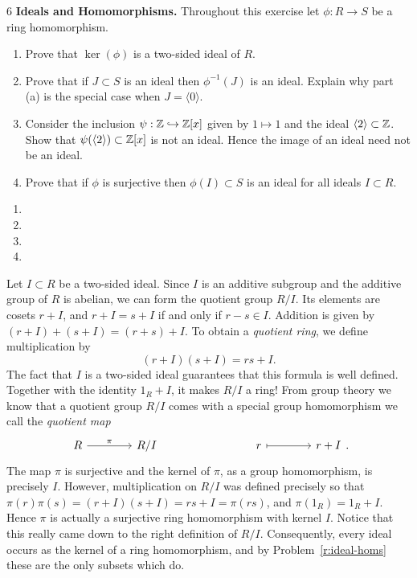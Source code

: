 \documentclass[Notebook.tex]{subfiles}
\begin{document}
\newpage

\begin{problem}{6}\label{r:ideal-homs}
	\textbf{Ideals and Homomorphisms.} Throughout this exercise let $\phi:R\to S$ be a ring homomorphism.
	\begin{enumerate}[label=(\alph*),ref=\theenumi\alph*]
		\item Prove that $\ker(\phi)$ is a two-sided ideal of $R$.
		\item Prove that if $J\subset S$ is an ideal then $\phi^{-1}(J)$ is an ideal. Explain why part (a) is the special case when $J=\langle0\rangle$.
		\item Consider the inclusion $\psi:\mathbb Z \hookrightarrow\mathbb Z[x]$ given by $1\mapsto 1$ and the ideal $\langle 2 \rangle \subset \mathbb Z$. Show that $\psi(\langle 2 \rangle) \subset \mathbb Z[x]$ is not an ideal. Hence the image of an ideal need not be an ideal.
		\item Prove that if $\phi$ is surjective then $\phi(I) \subset S$ is an ideal for all ideals $I \subset R$.
	\end{enumerate}
\end{problem}

\begin{solution}
	\bbni
	\begin{enumerate}[label=(\alph*),ref=\theenumi\alph*]
		\item
		\item
		\item
		\item
	\end{enumerate}
\end{solution}

\newpage

Let $I\subset R$ be a two-sided ideal. Since $I$ is an additive subgroup and the additive group of $R$ is abelian, we can form the quotient group $R/I$. Its elements are cosets $r+I$, and $r+I=s+I$ if and only if $r-s\in I$. Addition is given by $(r+I)+(s+I)=(r+s)+I$. To obtain a \emph{quotient ring}, we define multiplication by
\[
(r+I)(s+I)=rs+I.
\]
The fact that $I$ is a two-sided ideal guarantees that this formula is well defined. Together with the identity $1_R+I$, it makes $R/I$ a ring! From group theory we know that a quotient group $R/I$ comes with a special group homomorphism we call the \emph{quotient map}
\[
\begin{tikzcd}[row sep = .3em, column sep = 4em]
	R \arrow[r, "\pi"] & R/I & & r \arrow[r, mapsto] & r+I
\end{tikzcd}.
\]
The map $\pi$ is surjective and the kernel of $\pi$, as a group homomorphism, is precisely $I$. However, multiplication on $R/I$ was defined precisely so that $\pi(r)\pi(s)=(r+I)(s+I)=rs+I=\pi(rs)$, and $\pi(1_R)=1_R+I$. Hence $\pi$ is actually a surjective ring homomorphism with kernel $I$. Notice that this really came down to the right definition of $R/I$. Consequently, every ideal occurs as the kernel of a ring homomorphism, and by Problem~\ref{r:ideal-homs} these are the only subsets which do.
\end{document}
